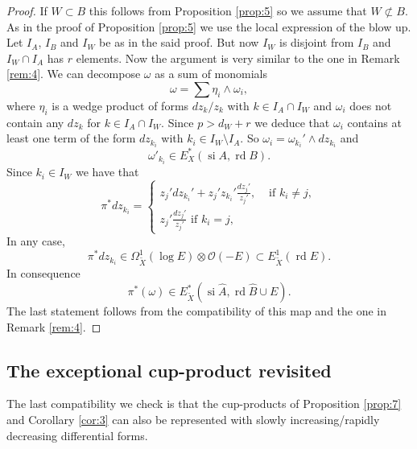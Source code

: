 \documentclass[11pt,a4paper]{amsart}
\newcommand{\caO}{\mathcal{O}}
\DeclareMathOperator{\si}{si}
\DeclareMathOperator{\rd}{rd}
\numberwithin{equation}{section}
\theoremstyle{plain}
\theoremstyle{definition}
\begin{document}
\begin{proof}
  If $W\subset B$ this follows from Proposition \ref{prop:5} so we
  assume that $W\not \subset B$. As in the proof of Proposition
  \ref{prop:5} we use the local expression of the blow up. Let
  $I_{A}$, $I_{B}$ and $I_{W}$ be as in the said proof. But now
  $I_{W}$ is disjoint from $I_{B}$ and $I_{W}\cap I_{A}$ has $r$
  elements. Now the argument is very similar to the one in Remark
  \ref{rem:4}. We can decompose $\omega $ as a sum of monomials
   \begin{displaymath}
     \omega = \sum \eta_{i}\wedge \omega_{i}, 
   \end{displaymath}
   where $\eta_{i}$ is a wedge product of forms $dz_{k}/z_{k}$ with
   $k\in I_{A}\cap I_{W}$ and $\omega _{i}$ does not contain any
   $dz_{k}$ for $k\in I_{A}\cap I_{W}$.
   Since $p>d_{W}+r$ we
 deduce that $\omega _{i}$ contains at least one term of the form $dz_{k_{i}}$ with
 $k_{i}\in I_{W}\setminus I_{A}$. So $\omega _{i}=\omega
 _{k_{i}}'\wedge dz_{k_i}$ and 
   \begin{displaymath}
     \omega' _{k_i}\in E _{X}^{\ast}(\si A, \rd B).
   \end{displaymath}
   Since $k_{i}\in I_{W}$ we have that
   \begin{displaymath}
     \pi ^{\ast}dz_{k_{i}} =
     \begin{cases}
       z_{j}'dz_{k_{i}}'+
       z_{j}'z_{k_{i}}'\frac{dz_{j}'}{z_{j}'},&\text{ if }k_{i}\not =
                                                j,\\
       z_{j}'\frac{dz_{j}'}{z_{j}'}\text{ if }k_{i}=
                                                j,
     \end{cases}
   \end{displaymath}
   In any case,
   \begin{displaymath}
     \pi ^{\ast}dz_{k_{i}} \in \Omega^{1}
     _{\widetilde X}(\log E)\otimes \caO(-E)
     \subset E^{1}_{\widetilde X}(\rd E).
   \end{displaymath}
In consequence 
 \begin{displaymath}
   \pi ^{\ast}(\omega )\in
   E_{\widetilde X}^{\ast}(\si \widehat{A}, \rd\widehat B\cup
   E).
 \end{displaymath}
 The last statement follows from the compatibility of this map and the
 one in Remark \ref{rem:4}.
\end{proof}

\subsection{The exceptional cup-product revisited}
\label{sec:except-cup-prod}
The last compatibility we check is that the cup-products of
Proposition \ref{prop:7} and Corollary \ref{cor:3} can also be
represented with slowly increasing/rapidly decreasing differential
forms.  
\end{document}

